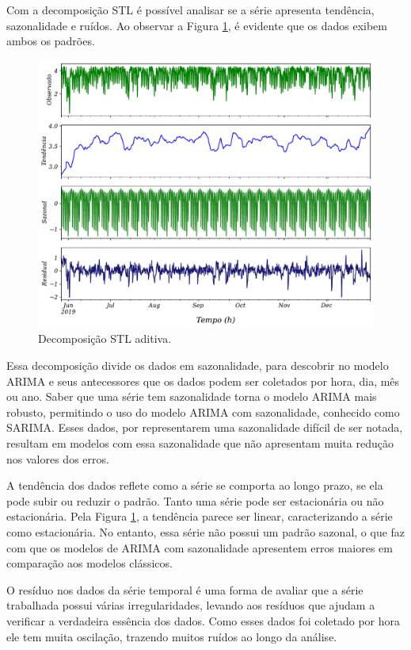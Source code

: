 Com a decomposição STL é possível analisar se a série apresenta tendência, sazonalidade e ruídos. Ao observar a Figura \ref{fig:stl}, é evidente que os dados exibem ambos os padrões. 

\begin{figure}[!htb]
	\centering
	\caption{Decomposição STL aditiva.}
	\label{fig:stl}
	\includegraphics[width=\linewidth]{Resultados/Figuras/STL}	
\end{figure}


Essa decomposição divide os dados em sazonalidade, para descobrir no modelo ARIMA e seus antecessores que os dados podem ser coletados por hora, dia, mês ou ano. Saber que uma série tem sazonalidade torna o modelo ARIMA mais robusto, permitindo o uso do modelo ARIMA com sazonalidade, conhecido como SARIMA. Esses dados, por representarem uma sazonalidade difícil de ser notada, resultam em modelos com essa sazonalidade que não apresentam muita redução nos valores dos erros.

A tendência dos dados reflete como a série se comporta ao longo prazo, se ela pode subir ou reduzir o padrão. Tanto uma série pode ser estacionária ou não estacionária. Pela Figura \ref{fig:stl}, a tendência parece ser linear, caracterizando a série como estacionária. No entanto, essa série não possui um padrão sazonal, o que faz com que os modelos de ARIMA com sazonalidade apresentem erros maiores em comparação aos modelos clássicos.

O resíduo nos dados da série temporal é uma forma de avaliar que a série trabalhada possui várias irregularidades, levando aos resíduos que ajudam a verificar a verdadeira essência dos dados. Como esses dados foi coletado por hora ele tem muita oscilação, trazendo muitos ruídos ao longo da análise.


